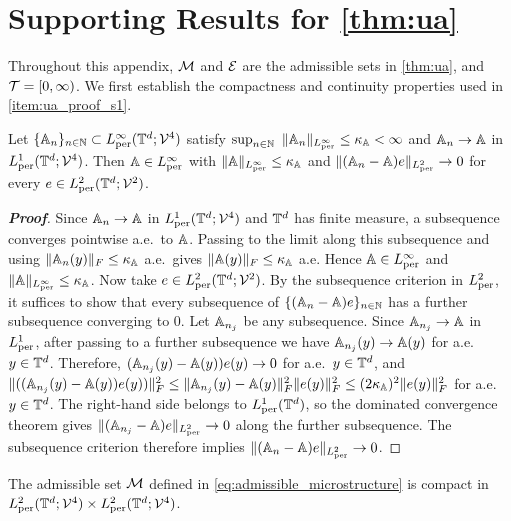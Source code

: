 \section{\texorpdfstring{{Supporting Results for \cref{thm:ua}}}{Supporting Results for the Universal Approximation Theorem}}\label{app:ua}

{Throughout this appendix, ${\mathcal{M}}$ and ${\mathcal{E}}$ are the admissible sets in \cref{thm:ua}, and {\color{blue}${\mathcal{T}}=[0,\infty)$}. We first establish the compactness and continuity properties used in \ref{item:ua_proof_s1}.}

\begin{lemma}\label{lem:strong_conv_tensor}
Let $\{\mathbb{A}_n\}_{n\in\mathbb{N}}\subset L^\infty_{\rm per}(\mathbb{T}^d;{\mathcal{V}}^4)$ satisfy
$\sup_{n\in\mathbb{N}}\ \|\mathbb{A}_n\|_{L^\infty_{\rm per}}\le \kappa_{\mathbb{A}}<\infty$ and $\mathbb{A}_n\to\mathbb{A}$ in $L^1_{\rm per}(\mathbb{T}^d;{\mathcal{V}}^4)$. Then $\mathbb{A}\in L^\infty_{\rm per}$ with $\|\mathbb{A}\|_{L^\infty_{\rm per}}\le \kappa_{\mathbb{A}}$ and $\| (\mathbb{A}_n-\mathbb{A})e\|_{L^2_{\rm per}}\to 0$ for every $e\in L^2_{\rm per}(\mathbb{T}^d;{\mathcal{V}}^{2})$.
\end{lemma}

\begin{proof}[\bf Proof]
Since $\mathbb{A}_n\to\mathbb{A}$ in $L^1_{\rm per}(\mathbb{T}^d;{\mathcal{V}}^4)$ and $\mathbb{T}^d$ has finite measure, a subsequence converges pointwise a.e.\ to $\mathbb{A}$. Passing to the limit along this subsequence and using $\|\mathbb{A}_n(y)\|_F\le \kappa_{\mathbb{A}}$ a.e.\ gives $\|\mathbb{A}(y)\|_F\le \kappa_{\mathbb{A}}$ a.e. Hence $\mathbb{A}\in L^\infty_{\rm per}$ and $\|\mathbb{A}\|_{L^\infty_{\rm per}}\le \kappa_{\mathbb{A}}$. Now take $e\in L^2_{\rm per}(\mathbb{T}^d;{\mathcal{V}}^2)$. By the subsequence criterion in $L^2_{\rm per}$, it suffices to show that every subsequence of $\{(\mathbb{A}_n-\mathbb{A})e\}_{n\in\mathbb{N}}$ has a further subsequence converging to $0$. Let $\mathbb{A}_{n_j}$ be any subsequence. Since $\mathbb{A}_{n_j}\to\mathbb{A}$ in $L^1_{\rm per}$, after passing to a further subsequence we have $\mathbb{A}_{n_j}(y)\to\mathbb{A}(y)$ for a.e.\ $y\in\mathbb{T}^d$. Therefore, $(\mathbb{A}_{n_j}(y)-\mathbb{A}(y))e(y)\to0$ for a.e.\ $y\in\mathbb{T}^d$, and
$\|((\mathbb{A}_{n_j}(y)-\mathbb{A}(y))e(y))\|_F^2
\le \|\mathbb{A}_{n_j}(y)-\mathbb{A}(y)\|_F^2\|e(y)\|_F^2
\le (2\kappa_{\mathbb{A}})^2\|e(y)\|_F^2$ for a.e.\ $y\in\mathbb{T}^d$. The right-hand side belongs to $L^1_{\rm per}(\mathbb{T}^d)$, so the dominated convergence theorem gives $\|(\mathbb{A}_{n_j}-\mathbb{A})e\|_{L^2_{\rm per}}\to0$ along the further subsequence. The subsequence criterion therefore implies $\|(\mathbb{A}_n-\mathbb{A})e\|_{L^2_{\rm per}}\to0$.
\end{proof}

\begin{lemma} \label{lem:bv_compact}
The admissible set ${\mathcal{M}}$ defined in \cref{eq:admissible_microstructure} is compact in $L^2_{\mathrm{per}}(\mathbb{T}^d;{\mathcal{V}}^{4})\times
L^2_{\mathrm{per}}(\mathbb{T}^d;{\mathcal{V}}^{4})$.
\end{lemma}

